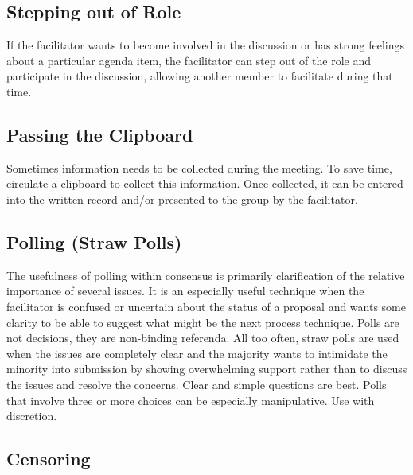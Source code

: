 \subsection{Stepping out of Role}

If the facilitator wants to become involved in the discussion or
has strong feelings about a particular agenda item, the facilitator
can step out of the role and participate in the discussion,
allowing another member to facilitate during that time.

\subsection{Passing the Clipboard}

Sometimes information needs to be collected during the meeting. To
save time, circulate a clipboard to collect this information. Once
collected, it can be entered into the written record and/or
presented to the group by the facilitator.

\subsection{Polling (Straw Polls)}

The usefulness of polling within consensus is primarily
clarification of the relative importance of several issues. It is
an especially useful technique when the facilitator is confused or
uncertain about the status of a proposal and wants some clarity to
be able to suggest what might be the next process technique. Polls
are not decisions, they are non-binding referenda. All too often,
straw polls are used when the issues are completely clear and the
majority wants to intimidate the minority into submission by
showing overwhelming support rather than to discuss the issues and
resolve the concerns. Clear and simple questions are best. Polls
that involve three or more choices can be especially
manipulative. Use with discretion.

\subsection{Censoring}

